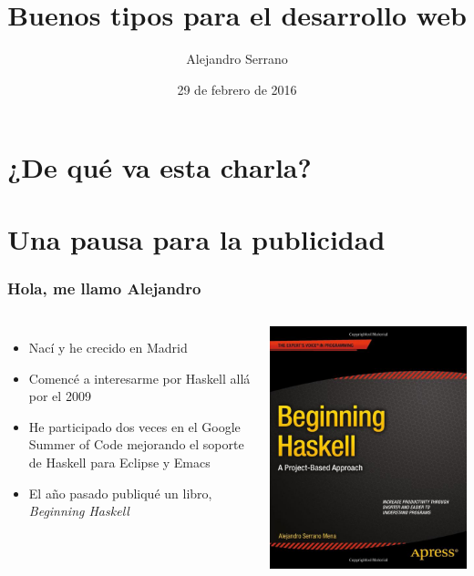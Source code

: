 \documentclass{beamer}
\title{Buenos tipos para el desarrollo web}
\date{29 de febrero de 2016}
\author{Alejandro Serrano}
\institute{Haskell-MAD}
\begin{document}
\maketitle

\section{¿De qué va esta charla?}

\section{Una pausa para la publicidad}

\begin{frame}[fragile]
\frametitle{Hola, me llamo Alejandro}
\begin{columns}
\begin{itemize}
\item Nací y he crecido en Madrid
\item Comencé a interesarme por Haskell allá por el 2009
\item He participado dos veces en el Google Summer of Code mejorando el soporte de Haskell para Eclipse y Emacs
\item El año pasado publiqué un libro, \emph{Beginning Haskell}
\end{itemize}
\includegraphics[scale=0.2]{libro.jpg}
\end{columns}
\end{frame}
\end{document}
